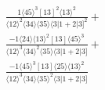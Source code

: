\documentclass[varwidth, border=5pt]{standalone}
\begin{document}
\begin{my}
$\begin{gathered}
\scriptscriptstyle\frac{1⟨45⟩^3[13]^2⟨13⟩^2}{⟨12⟩^2⟨34⟩⟨35⟩⟨3|1+2|3]^2}+\\
\scriptscriptstyle\frac{-1⟨24⟩⟨13⟩^2[13]⟨45⟩^3}{⟨12⟩^3⟨34⟩^2⟨35⟩⟨3|1+2|3]}+\\
\scriptscriptstyle\frac{-1⟨45⟩^3[13]⟨25⟩⟨13⟩^2}{⟨12⟩^3⟨34⟩⟨35⟩^2⟨3|1+2|3]}\phantom{+}
\end{gathered}$
\end{my}
\end{document}
